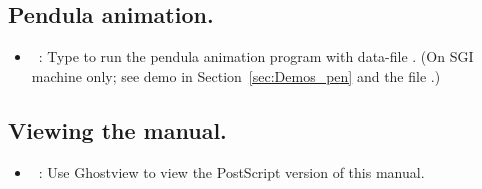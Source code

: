 \subsection{ Pendula animation.} 

\begin{itemize}
\item[\commandf{@pn}]~:
  Type  to run the pendula animation program
  with data-file . (On SGI machine only; see demo 
  in Section~\ref{sec:Demos_pen} and the file .)
\end{itemize}

\subsection{ Viewing the manual.} 

\begin{itemize}

\item[\commandf{@mn}]~: Use {\cal Ghostview} to view the PostScript version of this manual.
\end{itemize}

\newpage
